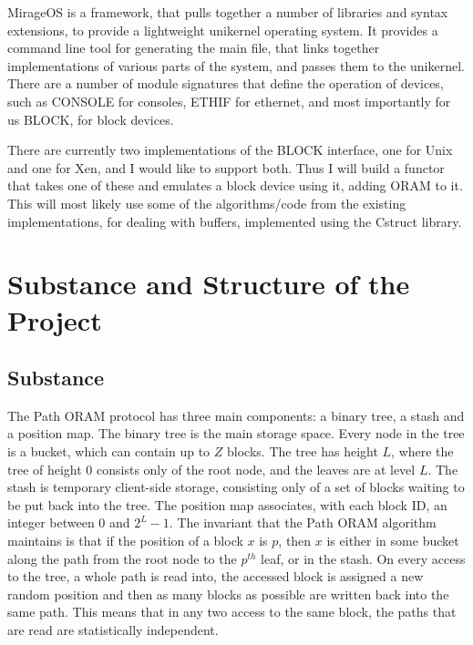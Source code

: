 \documentclass[12pt,a4paper,twoside]{article}
\begin{document}

MirageOS is a framework, that pulls together a number of libraries and syntax extensions, to provide a lightweight unikernel operating system. It provides a command line tool for generating the main file, that links together implementations of various parts of the system, and passes them to the unikernel. There are a number of module signatures that define the operation of devices, such as CONSOLE for consoles, ETHIF for ethernet, and most importantly for us BLOCK, for block devices.

There are currently two implementations of the BLOCK interface, one for Unix and one for Xen, and I would like to support both. Thus I will build a functor that takes one of these and emulates a block device using it, adding ORAM to it. This will most likely use some of the algorithms/code from the existing implementations, for dealing with buffers, implemented using the Cstruct library.


\section*{Substance and Structure of the Project}

\subsection*{Substance}


The Path ORAM protocol has three main components: a binary tree, a stash and a position map. The binary tree is the main storage space. Every node in the tree is a bucket, which can contain up to $Z$ blocks. The tree has height $L$, where the tree of height 0 consists only of the root node, and the leaves are at level $L$. The stash is temporary client-side storage, consisting only of a set of blocks waiting to be put back into the tree. The position map associates, with each block ID, an integer between 0 and $2^L-1$. The invariant that the Path ORAM algorithm maintains is that if the position of a block $x$ is $p$, then $x$ is either in some bucket along the path from the root node to the $p^{th}$ leaf, or in the stash. On every access to the tree, a whole path is read into, the accessed block is assigned a new random position and then as many blocks as possible are written back into the same path. This means that in any two access to the same block, the paths that are read are statistically independent.
\end{document}
